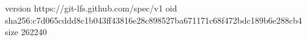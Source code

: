 version https://git-lfs.github.com/spec/v1
oid sha256:c7d065cddd8c1b043ff43816e28c898527ba671171c68f472bdc189b6e288cb4
size 262240
